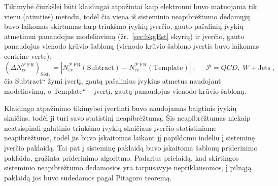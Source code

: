 \documentclass[a4paper, 12pt, oneside]{article}
\newcommand{\WJets}{W\! +\!\mathrm{Jets}}
\newcommand{\ltq}[1]{{\quotedblbase{}#1\textquotedblleft{}}}
\newcommand{\QCD}{QC\! D}
\newlength\q
\begin{document}
Tikimybė čiurkšlei būti klaidingai atpažintai kaip elektronui buvo matuojama tik vienu (atimties) metodu, todėl čia viena
iš sisteminio neapibrėžtumo dedamųjų buvo laikomas skirtumas tarp triukšmo įvykių įverčio, gauto pašalinių įvykių atmetimui
panaudojus modeliavimą (žr.\ \ref{sec:bkgEst} skyrių) ir įverčio, gauto panaudojus vienodo krūvio šabloną (vienodo krūvio
šablono įvertis buvo laikomas centrine verte):
\begin{equation}
\label{eq:systUncFRee}
	(\Delta N_{ee}^{\mathcal{P} \; \mathrm{FR}})_{\mathrm{Sist.\,}} =
	\left| N_{ee}^{\mathcal{P} \; \mathrm{FR}}(\mathrm{Subtract}) -
	N_{ee}^{\mathcal{P} \; \mathrm{FR}}(\mathrm{Template}) \right| \;  ;
	\;\;\;\;\; \mathcal{P} = \QCD, \; \WJets \; ,
\end{equation}
čia \ltq{Subtract} žymi įvertį, gautą pašalinius įvykius atmetus naudojant modeliavimą, o \ltq{Template} -- įvertį, gautą
panaudojus vienodo krūvio šabloną.

Klaidingo atpažinimo tikimybei įvertinti buvo naudojamas baigtinis įvykių skaičius, todėl ji turi savo statistinį neapibrėžtumą.
Šis neapibrėžtumas niekaip neatsispindi galutinio triukšmo įvykių skaičiaus įverčio statistiniame neapibrėžtume, todėl
jis buvo įskaitomas laikant jį papildomu indėliu į sisteminę įverčio paklaidą.
Tai pat į sisteminę paklaidą buvo įskaitoma šablonų priderinimo paklaida, grąžinta priderinimo algoritmo.
Padarius prielaidą, kad skirtingos sisteminio neapibrėžtumo dedamosios yra tarpusavyje nepriklausomos, į pilnąją paklaidą jos
buvo sudedamos pagal Pitagoro teoremą.


\newpage
\end{document}
